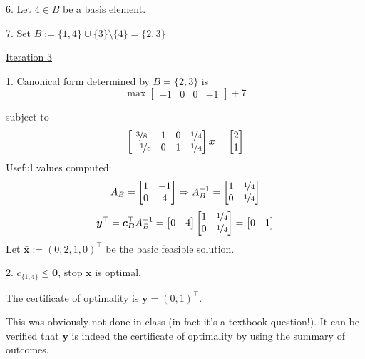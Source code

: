 6. Let $ 4\in B $ be a basis element.

7. Set $ B:=\{1,4\}\cup \{3\}\setminus\{4\}=\{2,3\} $

\underline{Iteration 3}

1. Canonical form determined by $ B=\{2,3\} $ is
\[ \max
\begin{bmatrix}
    -1 & 0 & 0 & -1
\end{bmatrix} + 7\]

subject to
\[ 
\begin{bmatrix}
    \nicefrac{3}{8} & 1 & 0 & \nicefrac{1}{4} \\
    -\nicefrac{1}{8} & 0 & 1 & \nicefrac{1}{4}
\end{bmatrix}\bm{x}=
\begin{bmatrix}
    2\\
    1
\end{bmatrix}\]
Useful values computed:
\[ A_B=
\begin{bmatrix}
    1 & -1\\
    0 & 4\\
\end{bmatrix} \Rightarrow
A_B^{-1}=
\begin{bmatrix}
    1 & \nicefrac{1}{4} \\
    0 & \nicefrac{1}{4} 
\end{bmatrix} \]
\[ \bm{y}^\top=\bm{c_B}^\top A_B^{-1}=
\begin{bmatrix}
    0 & 4
\end{bmatrix}
\begin{bmatrix}
    1 & \nicefrac{1}{4} \\
    0 & \nicefrac{1}{4} 
\end{bmatrix}=
\begin{bmatrix}
    0 & 1
\end{bmatrix}\]
Let $ \bm{\bar{x}}:=(0,2,1,0)^\top $ be the basic feasible solution.

2. $ c_{\{1,4\}}\le \bm{0} $, stop $ \bm{\bar{x}} $ is optimal.

The certificate of optimality is $ \bm{y}=(0,1)^\top $.

\begin{remark}
    This was obviously not done in class (in fact it's a textbook question!).
    It can be verified that $ \bm{y} $ is indeed the certificate of optimality by
    using the summary of outcomes.
\end{remark}